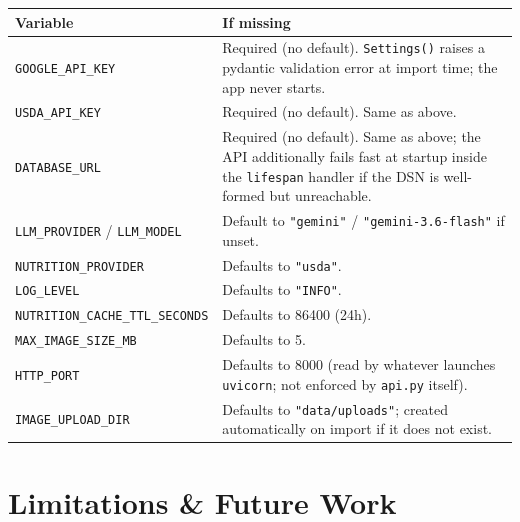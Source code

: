 \documentclass[11pt,a4paper]{article}
\begin{document}
\begin{center}\small
\begin{tabularx}{\textwidth}{@{}lX@{}}
\toprule
\textbf{Variable} & \textbf{If missing} \\
\midrule
\texttt{GOOGLE\_API\_KEY} & Required (no default). \texttt{Settings()} raises a pydantic validation error at import time; the app never starts. \\
\texttt{USDA\_API\_KEY} & Required (no default). Same as above. \\
\texttt{DATABASE\_URL} & Required (no default). Same as above; the API additionally fails fast at startup inside the \texttt{lifespan} handler if the DSN is well-formed but unreachable. \\
\texttt{LLM\_PROVIDER} / \texttt{LLM\_MODEL} & Default to \texttt{"gemini"} / \texttt{"gemini-3.6-flash"} if unset. \\
\texttt{NUTRITION\_PROVIDER} & Defaults to \texttt{"usda"}. \\
\texttt{LOG\_LEVEL} & Defaults to \texttt{"INFO"}. \\
\texttt{NUTRITION\_CACHE\_TTL\_SECONDS} & Defaults to 86400 (24h). \\
\texttt{MAX\_IMAGE\_SIZE\_MB} & Defaults to 5. \\
\texttt{HTTP\_PORT} & Defaults to 8000 (read by whatever launches \texttt{uvicorn}; not enforced by \texttt{api.py} itself). \\
\texttt{IMAGE\_UPLOAD\_DIR} & Defaults to \texttt{"data/uploads"}; created automatically on import if it does not exist. \\
\bottomrule
\end{tabularx}
\end{center}

\section{Limitations \& Future Work}\label{sec:limits}
\end{document}
